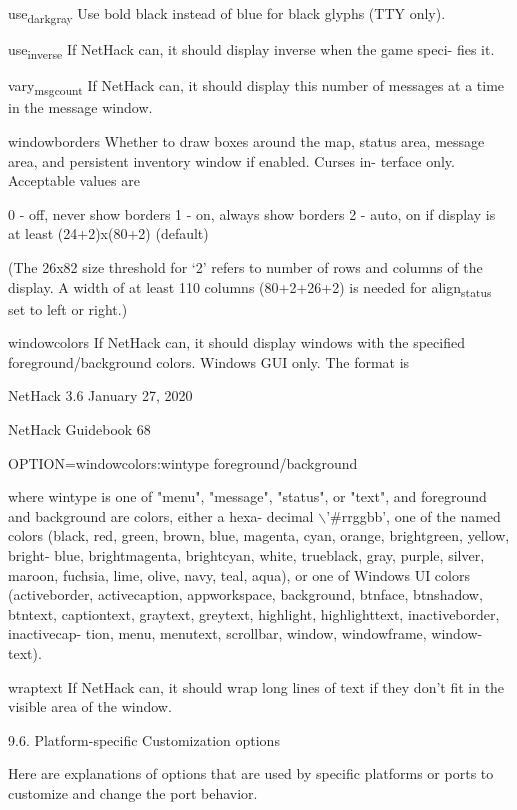 \documentclass[11pt]{article}
\begin{document}
use\textsubscript{darkgray}
 Use bold black instead of blue for black glyphs (TTY only).

use\textsubscript{inverse}
 If NetHack can, it should display inverse when the game speci-
 fies it.

vary\textsubscript{msgcount}
 If NetHack can, it should display this number of messages at a
 time in the message window.

windowborders
 Whether to draw boxes around the map, status area, message
 area, and persistent inventory window if enabled. Curses in-
 terface only. Acceptable values are

0 - off, never show borders
1 - on, always show borders
2 - auto, on if display is at least (24+2)x(80+2) (default)

(The 26x82 size threshold for `2' refers to number of rows and
columns of the display.  A width of at least 110 columns
(80+2+26+2) is needed for align\textsubscript{status} set to left or right.)

windowcolors
 If NetHack can, it should display windows with the specified
 foreground/background colors. Windows GUI only. The format is




NetHack 3.6                   January 27, 2020





NetHack Guidebook                       68



OPTION=windowcolors:wintype foreground/background

   where wintype is one of "menu", "message", "status", or
"text", and foreground and background are colors, either a hexa-
decimal $\backslash$'\#rrggbb', one of the named colors (black, red, green,
brown, blue, magenta, cyan, orange, brightgreen, yellow, bright-
blue, brightmagenta, brightcyan, white, trueblack, gray, purple,
silver, maroon, fuchsia, lime, olive, navy, teal, aqua), or one
of Windows UI colors (activeborder, activecaption, appworkspace,
background, btnface, btnshadow, btntext, captiontext, graytext,
greytext, highlight, highlighttext, inactiveborder, inactivecap-
tion, menu, menutext, scrollbar, window, windowframe, window-
text).

wraptext
 If NetHack can, it should wrap long lines of text if they don't
 fit in the visible area of the window.

9.6. Platform-specific Customization options

   Here are explanations of options that are used by specific
platforms or ports to customize and change the port behavior.
\end{document}
